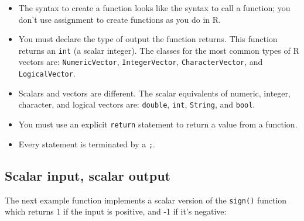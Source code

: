 \begin{itemize}
\item
  The syntax to create a function looks like the syntax to call a
  function; you don't use assignment to create functions as you do in R.
\item
  You must declare the type of output the function returns. This
  function returns an \texttt{int} (a scalar integer). The classes for
  the most common types of R vectors are: \texttt{NumericVector},
  \texttt{IntegerVector}, \texttt{CharacterVector}, and
  \texttt{LogicalVector}.
\item
  Scalars and vectors are different. The scalar equivalents of numeric,
  integer, character, and logical vectors are: \texttt{double},
  \texttt{int}, \texttt{String}, and \texttt{bool}.
\item
  You must use an explicit \texttt{return} statement to return a value
  from a function.
\item
  Every statement is terminated by a \texttt{;}.
\end{itemize}

\hypertarget{scalar-input-scalar-output}{%
\subsection{Scalar input, scalar
output}\label{scalar-input-scalar-output}}

The next example function implements a scalar version of the
\texttt{sign()} function which returns 1 if the input is positive, and
-1 if it's negative:

\begin{Shaded}
\begin{Highlighting}[]
\StringTok{ }
  \OperatorTok{>}\StringTok{ }\NormalTok{) \{}
\NormalTok{  \} } \OperatorTok{==}\StringTok{ }\NormalTok{) \{}
\NormalTok{  \} }\NormalTok{ \{}
\NormalTok{  \}}
\NormalTok{\}}

\NormalTok{(}
\StringTok{  \}}
\NormalTok{)}
\end{Highlighting}
\end{Shaded}

